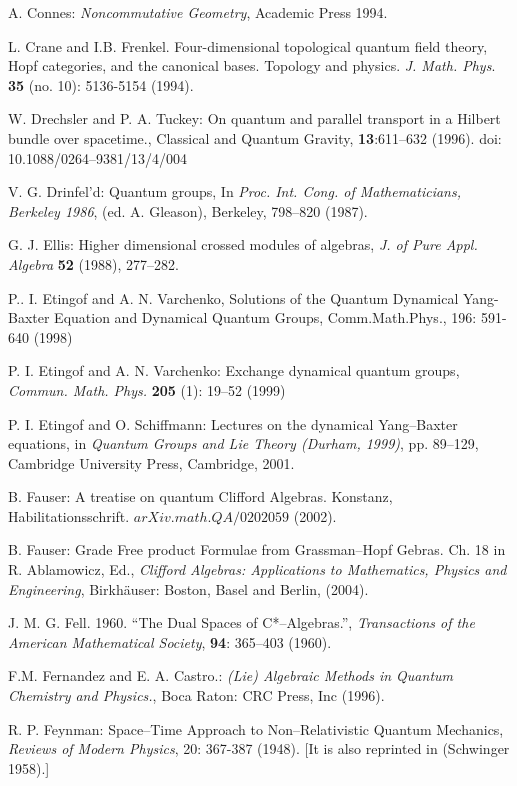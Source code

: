 \documentclass[12pt]{article}
\theoremstyle{plain}
\theoremstyle{definition}
\numberwithin{equation}{section}
\newcommand{\<}{{\langle}}
\begin{document}
\begin{thebibliography}{9}
A. Connes: \emph{Noncommutative Geometry}, Academic Press 1994.

L. Crane and I.B. Frenkel. Four-dimensional topological quantum field theory, Hopf categories, and the canonical bases. Topology and physics. \textit{J. Math. Phys}. \textbf{35} (no. 10): 5136-5154 (1994).

W. Drechsler and P. A. Tuckey:  On quantum and parallel transport in a Hilbert bundle over spacetime., Classical and Quantum Gravity, \textbf{13}:611--632 (1996).
doi: 10.1088/0264--9381/13/4/004


V. G. Drinfel'd: Quantum groups, In \emph{Proc. Int. Cong. of
Mathematicians, Berkeley 1986}, (ed. A. Gleason), Berkeley, 798--820 (1987).

G. J. Ellis: Higher dimensional crossed modules of algebras,
\emph{J. of Pure Appl. Algebra} \textbf{52} (1988), 277--282.

P.. I. Etingof and A. N. Varchenko, Solutions of the Quantum Dynamical Yang-Baxter Equation and Dynamical Quantum Groups, Comm.Math.Phys., 196:  591-640 (1998)

P. I. Etingof and A. N. Varchenko: Exchange dynamical quantum
groups, \emph{Commun. Math. Phys.} \textbf{205} (1): 19--52 (1999)

P. I. Etingof and O. Schiffmann: Lectures on the dynamical Yang--Baxter equations, in \emph{Quantum Groups and Lie Theory (Durham, 1999)}, pp. 89--129, Cambridge University Press, Cambridge, 2001.

B. Fauser: A treatise on quantum Clifford Algebras. Konstanz,
Habilitationsschrift.  $arXiv.math.QA/0202059$ (2002).

B. Fauser: Grade Free product Formulae from Grassman--Hopf Gebras.
Ch. 18 in R. Ablamowicz, Ed., \emph{Clifford Algebras: Applications to Mathematics, Physics and Engineering}, Birkh\"{a}user: Boston, Basel and Berlin, (2004).


J. M. G. Fell. 1960. ``The Dual Spaces of  C*--Algebras.'', {\em Transactions of the American
Mathematical Society}, \textbf{94}: 365--403 (1960).

F.M. Fernandez and E. A. Castro.:  \textit{(Lie) Algebraic Methods in Quantum Chemistry and Physics.}, Boca Raton: CRC Press, Inc  (1996).

 R. P. Feynman: Space--Time Approach to Non--Relativistic Quantum Mechanics, {\em Reviews 
of Modern Physics}, 20: 367-387 (1948). [It is also reprinted in (Schwinger 1958).]



\end{thebibliography}
\end{document}
